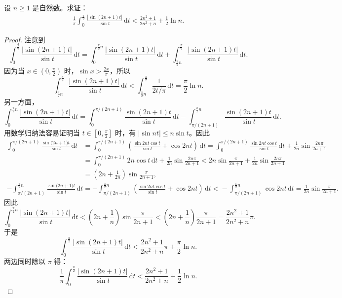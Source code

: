 \documentclass[../../main.tex]{subfiles}%
\begin{document}
\begin{example}
设 \( n \geqslant 1 \) 是自然数。求证：
\begin{align*}
\frac{1}{\pi} \int_{0}^{\frac{\pi}{2}} \frac{|\sin(2n + 1)t|}{\sin t} \, \mathrm{d}t < \frac{2n^2 + 1}{2n^2 + n} + \frac{1}{2} \ln n.
\end{align*}
\end{example}
\begin{proof}
注意到
\[
\int_{0}^{\frac{\pi}{2}} \frac{|\sin(2n + 1)t|}{\sin t} \, \mathrm{d}t = \int_{0}^{\frac{\pi}{2}n} \frac{|\sin(2n + 1)t|}{\sin t} \, \mathrm{d}t + \int_{\frac{\pi}{2}n}^{\frac{\pi}{2}} \frac{|\sin(2n + 1)t|}{\sin t} \, \mathrm{d}t.
\]
因为当 \( x \in \left( 0, \frac{\pi}{2} \right) \) 时，\( \sin x > \frac{2x}{\pi} \)，所以
\[
\int_{\frac{\pi}{2}n}^{\frac{\pi}{2}} \frac{|\sin(2n + 1)t|}{\sin t} \, \mathrm{d}t < \int_{\frac{\pi}{2}n}^{\frac{\pi}{2}} \frac{1}{2t/\pi} \, \mathrm{d}t = \frac{\pi}{2} \ln n.
\]
另一方面，
\[
\int_{0}^{\frac{\pi}{2}n} \frac{|\sin(2n + 1)t|}{\sin t} \, \mathrm{d}t = \int_{0}^{\pi/(2n + 1)} \frac{\sin(2n + 1)t}{\sin t} \, \mathrm{d}t - \int_{\pi/(2n + 1)}^{\frac{\pi}{2}n} \frac{\sin(2n + 1)t}{\sin t} \, \mathrm{d}t.
\]
用数学归纳法容易证明当 \( t \in \left[ 0, \frac{\pi}{2} \right] \) 时，有 \( |\sin nt| \leqslant n \sin t \)。因此
\begin{align*}
\int_0^{\pi/(2n+1)}{\frac{\sin\mathrm{(}2n+1)t}{\sin t}\,\mathrm{d}t}&=\int_0^{\pi/(2n+1)}{\left( \frac{\sin 2nt\cos t}{\sin t}+\cos 2nt \right) \,\mathrm{d}t=\int_0^{\pi/(2n+1)}{\frac{\sin 2nt\cos t}{\sin t}\,\mathrm{d}t}}+\frac{1}{2n}\sin \frac{2n\pi}{2n+1}
\\
&=\int_0^{\pi/(2n+1)}{2n\cos t\,\mathrm{d}t}+\frac{1}{2n}\sin \frac{2n\pi}{2n+1}<2n\sin \frac{\pi}{2n+1}+\frac{1}{2n}\sin \frac{2n\pi}{2n+1}
\\
&=\left( 2n+\frac{1}{2n} \right) \sin \frac{\pi}{2n+1},
\end{align*}
\begin{align*}
-\int_{\pi/(2n+1)}^{\frac{\pi}{2}n}{\frac{\sin\mathrm{(}2n+1)t}{\sin t}\,\mathrm{d}t}=-\int_{\pi/(2n+1)}^{\frac{\pi}{2}n}{\left( \frac{\sin 2nt\cos t}{\sin t}+\cos 2nt \right) \,\mathrm{d}t<}-\int_{\pi/(2n+1)}^{\frac{\pi}{2}n}{\cos 2nt\,\mathrm{d}t=\frac{1}{2n}\sin \frac{\pi}{2n+1}.}
\end{align*}
因此
\[
\int_{0}^{\frac{\pi}{2}n} \frac{|\sin(2n + 1)t|}{\sin t} \, \mathrm{d}t < \left( 2n + \frac{1}{n} \right) \sin \frac{\pi}{2n + 1} < \left( 2n + \frac{1}{n} \right) \frac{\pi}{2n + 1} = \frac{2n^2 + 1}{2n^2 + n} \pi.
\]
于是
\[
\int_{0}^{\frac{\pi}{2}} \frac{|\sin(2n + 1)t|}{\sin t} \, \mathrm{d}t < \frac{2n^2 + 1}{2n^2 + n} \pi + \frac{\pi}{2} \ln n.
\]
两边同时除以 \( \pi \) 得：
\[
\frac{1}{\pi} \int_{0}^{\frac{\pi}{2}} \frac{|\sin(2n + 1)t|}{\sin t} \, \mathrm{d}t < \frac{2n^2 + 1}{2n^2 + n} + \frac{1}{2} \ln n.
\]
\end{proof}
\end{document}
